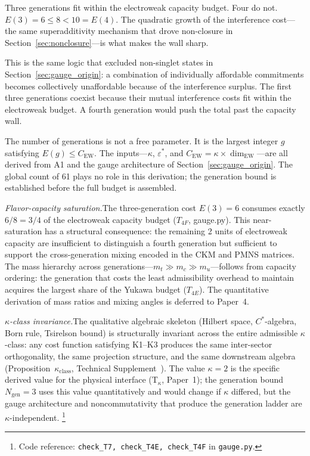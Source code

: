 \documentclass[11pt]{article}
\newcommand{\coderef}[2]{\footnote{Code reference: \texttt{#1} in \texttt{#2}.}}
\begin{document}
Three generations fit within the electroweak capacity budget.  Four do not.  $E(3) = 6 \le 8 < 10 = E(4)$.  The quadratic growth of the interference cost---the same superadditivity mechanism that drove non-closure in Section~\ref{sec:nonclosure}---is what makes the wall sharp.

This is the same logic that excluded non-singlet states in Section~\ref{sec:gauge_origin}: a combination of individually affordable commitments becomes collectively unaffordable because of the interference surplus.  The first three generations coexist because their mutual interference costs fit within the electroweak budget.  A fourth generation would push the total past the capacity wall.

The number of generations is not a free parameter.  It is the largest integer $g$ satisfying $E(g) \le C_{\mathrm{EW}}$.  The inputs---$\kappa$, $\varepsilon^*$, and $C_{\mathrm{EW}} = \kappa \times \dim_{\mathrm{EW}}$---are all derived from A1 and the gauge architecture of Section~\ref{sec:gauge_origin}.  The global count of 61 plays no role in this derivation; the generation bound is established before the full budget is assembled.

\smallskip
\noindent\textit{Flavor-capacity saturation.}\quad The three-generation cost $E(3) = 6$ consumes exactly $6/8 = 3/4$ of the electroweak capacity budget ($T_{4F}$, gauge.py).  This near-saturation has a structural consequence: the remaining 2 units of electroweak capacity are insufficient to distinguish a fourth generation but sufficient to support the cross-generation mixing encoded in the CKM and PMNS matrices.  The mass hierarchy across generations---$m_t \gg m_c \gg m_u$---follows from capacity ordering: the generation that costs the least admissibility overhead to maintain acquires the largest share of the Yukawa budget ($T_{4E}$).  The quantitative derivation of mass ratios and mixing angles is deferred to Paper~4.

\smallskip
\noindent\textit{$\kappa$-class invariance.}\quad The qualitative algebraic skeleton (Hilbert space, $C^*$-algebra, Born rule, Tsirelson bound) is structurally invariant across the entire admissible $\kappa$-class: any cost function satisfying K1--K3 produces the same inter-sector orthogonality, the same projection structure, and the same downstream algebra (Proposition~$\kappa_{\mathrm{class}}$, Technical Supplement~\cite{BrookeSupplement}).  The value $\kappa = 2$ is the specific derived value for the physical interface (T$_\kappa$, Paper~1); the generation bound $N_{\mathrm{gen}} = 3$ uses this value quantitatively and would change if $\kappa$ differed, but the gauge architecture and noncommutativity that produce the generation ladder are $\kappa$-independent.
\coderef{check\_T7, check\_T4E, check\_T4F}{gauge.py}
\end{document}
